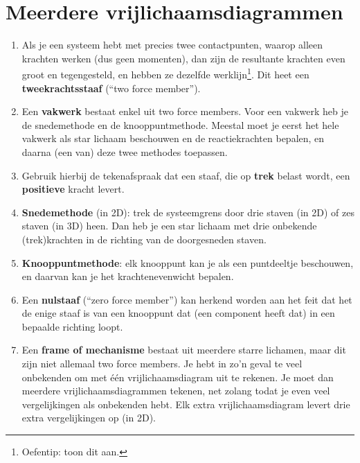 \documentclass{article}
\begin{document}
 \section{Meerdere vrijlichaamsdiagrammen}

\begin{enumerate}
\item Als je een systeem hebt met precies twee contactpunten, waarop alleen krachten werken (dus geen momenten), dan zijn de resultante krachten even groot en tegengesteld, en hebben ze dezelfde werklijn\footnote{Oefentip: toon dit aan.}. Dit heet een \textbf{tweekrachtsstaaf} (``two force member'').

\item Een \textbf{vakwerk} bestaat enkel uit two force members. Voor een vakwerk heb je de snedemethode en de knooppuntmethode. Meestal moet je eerst het hele vakwerk als star lichaam beschouwen en de reactiekrachten bepalen, en daarna (een van) deze twee methodes toepassen.

\item Gebruik hierbij de tekenafspraak dat een staaf, die op \textbf{trek} belast wordt, een \textbf{positieve} kracht levert.

\item \textbf{Snedemethode} (in 2D): trek de systeemgrens door drie staven (in 2D) of zes staven (in 3D) heen. Dan heb je een star lichaam met drie onbekende (trek)krachten in de richting van de doorgesneden staven.

\item \textbf{Knooppuntmethode}: elk knooppunt kan je als een puntdeeltje beschouwen, en daarvan kan je het krachtenevenwicht bepalen.

\item Een \textbf{nulstaaf} (``zero force member'') kan herkend worden aan het feit dat het de enige staaf is van een knooppunt dat (een component heeft dat) in een bepaalde richting loopt.

\item Een \textbf{frame of mechanisme} bestaat uit meerdere starre lichamen, maar dit zijn niet allemaal two force members. Je hebt in zo'n geval te veel onbekenden om met één vrijlichaamsdiagram uit te rekenen. Je moet dan meerdere vrijlichaamsdiagrammen tekenen, net zolang todat je even veel vergelijkingen als onbekenden hebt. Elk extra vrijlichaamsdiagram levert drie extra vergelijkingen op (in 2D).
\end{enumerate}
\end{document}
